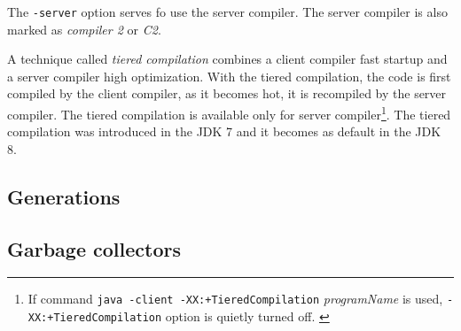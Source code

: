 \documentclass[
  digital, %
  oneside,
  notable, %
  nolof,     %
  nolot     %
]{fithesis3}
\begin{document}
The \texttt{-server} option serves fo use the server compiler. The server compiler is also marked as \textit{compiler 2} or \textit{C2}.

A technique called \textit{tiered compilation} combines a client compiler fast startup and a server compiler high optimization. With the tiered compilation, the code is first compiled by the client compiler, as it becomes hot, it is recompiled by the server compiler. The tiered compilation is available only for server compiler\footnote{If command \texttt{java -client -XX:+TieredCompilation}\textit{ programName} is used, \texttt{-XX:+TieredCompilation} option is quietly turned off. \cite{scott}}. The tiered compilation was introduced in the JDK 7 and it becomes as default in the JDK 8. \cite{scott}
\subsection{Generations}
\subsection{Garbage collectors}
\end{document}
